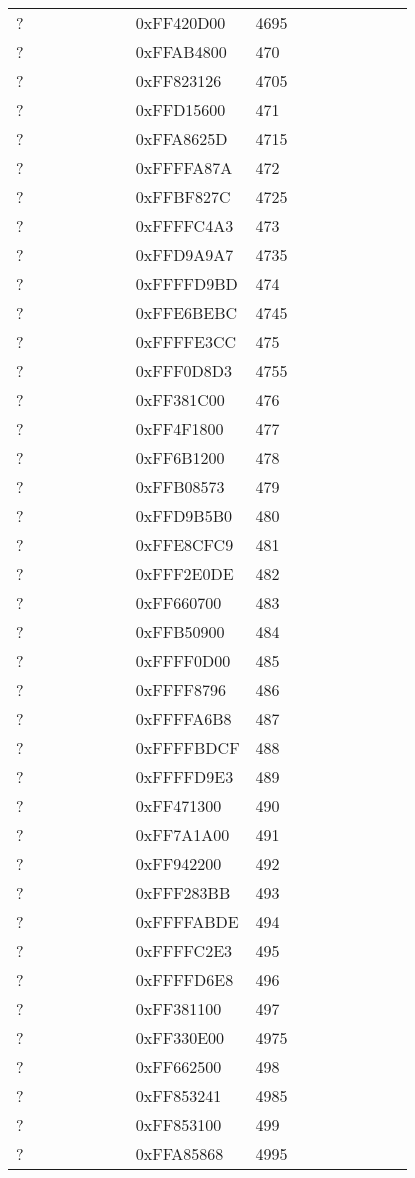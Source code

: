 \begin{longtable}{p{0.3\linewidth} p{0.3\linewidth} p{0.4\linewidth}}
? &  0xFF420D00 &  4695\\
? &  0xFFAB4800 &  470\\
? &  0xFF823126 &  4705\\
? &  0xFFD15600 &  471\\
? &  0xFFA8625D &  4715\\
? &  0xFFFFA87A &  472\\
? &  0xFFBF827C &  4725\\
? &  0xFFFFC4A3 &  473\\
? &  0xFFD9A9A7 &  4735\\
? &  0xFFFFD9BD &  474\\
? &  0xFFE6BEBC &  4745\\
? &  0xFFFFE3CC &  475\\
? &  0xFFF0D8D3 &  4755\\
? &  0xFF381C00 &  476\\
? &  0xFF4F1800 &  477\\
? &  0xFF6B1200 &  478\\
? &  0xFFB08573 &  479\\
? &  0xFFD9B5B0 &  480\\
? &  0xFFE8CFC9 &  481\\
? &  0xFFF2E0DE &  482\\
? &  0xFF660700 &  483\\
? &  0xFFB50900 &  484\\
? &  0xFFFF0D00 &  485\\
? &  0xFFFF8796 &  486\\
? &  0xFFFFA6B8 &  487\\
? &  0xFFFFBDCF &  488\\
? &  0xFFFFD9E3 &  489\\
? &  0xFF471300 &  490\\
? &  0xFF7A1A00 &  491\\
? &  0xFF942200 &  492\\
? &  0xFFF283BB &  493\\
? &  0xFFFFABDE &  494\\
? &  0xFFFFC2E3 &  495\\
? &  0xFFFFD6E8 &  496\\
? &  0xFF381100 &  497\\
? &  0xFF330E00 &  4975\\
? &  0xFF662500 &  498\\
? &  0xFF853241 &  4985\\
? &  0xFF853100 &  499\\
? &  0xFFA85868 &  4995\\

\end{longtable}
